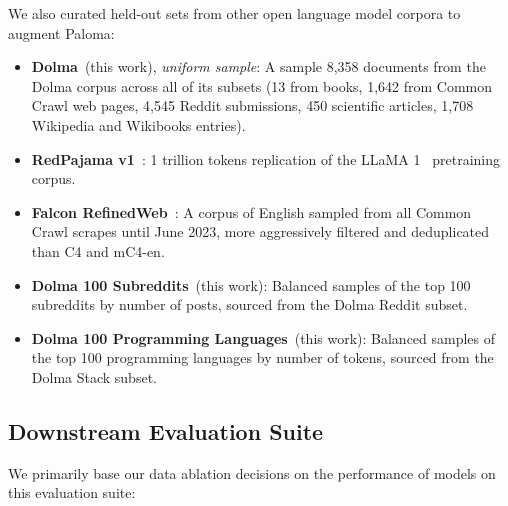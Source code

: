 \documentclass{article}
\newcommand{\dolma}{Dolma\xspace}
\begin{document}
We also curated held-out sets from other open language model corpora to augment Paloma:
\begin{itemize}[leftmargin=1em]
    \item \textbf{\dolma}~(this work), \textit{uniform sample}: A sample 8,358 documents from the \dolma corpus across all of its subsets (13 from books, 1,642 from Common Crawl web pages, 4,545 Reddit submissions, 450 scientific articles, 1,708 Wikipedia and Wikibooks entries).
    \item \textbf{RedPajama v1}~\citep{redpajama2}: 1 trillion tokens replication of the LLaMA 1~\citep{Touvron2023LLaMAOA} pretraining corpus.
    \item \textbf{Falcon RefinedWeb}~\citep{Penedo2023TheRD}: A corpus of English sampled from all Common Crawl scrapes until June 2023, more aggressively filtered and deduplicated than C4 and mC4-en.
    \item \textbf{Dolma 100 Subreddits}~(this work): Balanced samples of the top 100 subreddits by number of posts, sourced from the \dolma Reddit subset.
    \item \textbf{Dolma 100 Programming Languages}~(this work): Balanced samples of the top 100 programming languages by number of tokens, sourced from the \dolma Stack subset.
\end{itemize}

\subsection{Downstream Evaluation Suite}
\label{sec:setup:downstream}

We primarily base our data ablation decisions on the performance of models on this evaluation suite:
\end{document}
